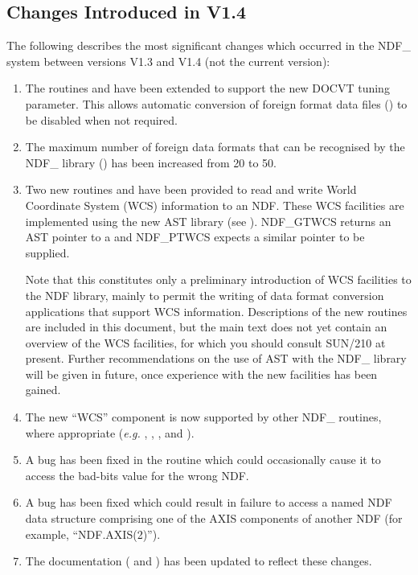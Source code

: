\documentclass[twoside,11pt,nolof]{starlink}
\providecommand{\st}[1]{{\emph{#1}}}
\begin{document}
\subsection{Changes Introduced in V1.4}

The following describes the most significant changes which occurred in
the NDF\_ system between versions V1.3 and V1.4 (not the current
version):

\begin{enumerate}

\item The routines  and
 have been extended to support the new
DOCVT tuning parameter. This allows automatic conversion of foreign
format data files () to be disabled when not
required.

\item The maximum number of foreign data formats that can be
recognised by the NDF\_ library () has been
increased from 20 to 50.

\item Two new routines  and
 have been provided to read and write
World Coordinate System (WCS) information to an NDF. These WCS
facilities are implemented using the new AST library (see
).  NDF\_GTWCS returns an AST pointer to a
 and NDF\_PTWCS expects a similar
pointer to be supplied.

Note that this constitutes only a preliminary introduction of WCS
facilities to the NDF library, mainly to permit the writing of data
format conversion applications that support WCS information.
Descriptions of the new routines are included in this document, but
the main text does not yet contain an overview of the WCS facilities,
for which you should consult SUN/210 at present. Further
recommendations on the use of AST with the NDF\_ library will be given
in future, once experience with the new facilities has been gained.

\item The new ``WCS'' component is now supported by other NDF\_
routines, where appropriate (\st{e.g.\/}
, ,
,  and
).

\item A bug has been fixed in the 
routine which could occasionally cause it to access the bad-bits value
for the wrong NDF.

\item A bug has been fixed which could result in failure to access a
named NDF data structure comprising one of the AXIS components of
another NDF (for example, ``NDF.AXIS(2)'').

\item The documentation ( and
) has been updated to reflect these changes.

\end{enumerate}
\end{document}

